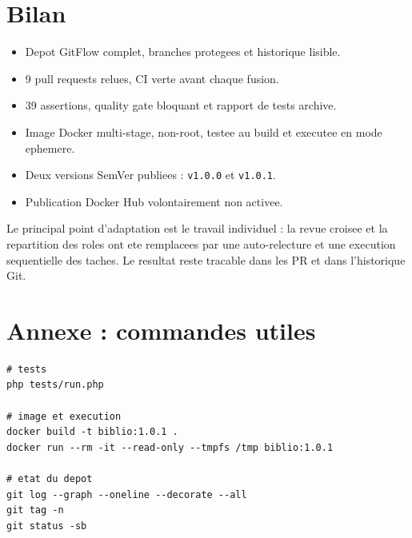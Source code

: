 \documentclass[11pt,a4paper]{article}
\begin{document}
\section{Bilan}

\begin{itemize}[leftmargin=1.2cm]
  \item Depot GitFlow complet, branches protegees et historique lisible.
  \item 9 pull requests relues, CI verte avant chaque fusion.
  \item 39 assertions, quality gate bloquant et rapport de tests archive.
  \item Image Docker multi-stage, non-root, testee au build et executee en
        mode ephemere.
  \item Deux versions SemVer publiees : \texttt{v1.0.0} et \texttt{v1.0.1}.
  \item Publication Docker Hub volontairement non activee.
\end{itemize}

Le principal point d'adaptation est le travail individuel : la revue croisee
et la repartition des roles ont ete remplacees par une auto-relecture et une
execution sequentielle des taches. Le resultat reste tracable dans les PR et
dans l'historique Git.

\section*{Annexe : commandes utiles}

\begin{lstlisting}
# tests
php tests/run.php

# image et execution
docker build -t biblio:1.0.1 .
docker run --rm -it --read-only --tmpfs /tmp biblio:1.0.1

# etat du depot
git log --graph --oneline --decorate --all
git tag -n
git status -sb
\end{lstlisting}
\end{document}
